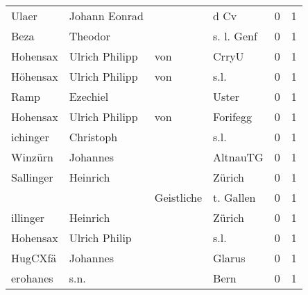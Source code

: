 \begin{center}
\begin{tiny}
\begin{longtabu}{llllrr}
                    Ulaer &                      Johann Eonrad &             &                                        d Cv &          0 &         1 \\
                     Beza &                            Theodor &             &                                  s. l. Genf &          0 &         1 \\
                 Hohensax &                     Ulrich Philipp &         von &                                       CrryU &          0 &         1 \\
                 Höhensax &                     Ulrich Philipp &         von &                                        s.l. &          0 &         1 \\
                     Ramp &                           Ezechiel &             &                                       Uster &          0 &         1 \\
                 Hohensax &                     Ulrich Philipp &         von &                                    Forifegg &          0 &         1 \\
                 ichinger &                          Christoph &             &                                        s.l. &          0 &         1 \\
                  Winzürn &                           Johannes &             &                                    AltnauTG &          0 &         1 \\
                Sallinger &                           Heinrich &             &                                      Zürich &          0 &         1 \\
                          &                                    &  Geistliche &                                   t. Gallen &          0 &         1 \\
                 illinger &                           Heinrich &             &                                      Zürich &          0 &         1 \\
                 Hohensax &                      Ulrich Philip &             &                                        s.l. &          0 &         1 \\
                  HugCXfä &                           Johannes &             &                                      Glarus &          0 &         1 \\
                 erohanes &                               s.n. &             &                                        Bern &          0 &         1 \\

\end{longtabu}
\end{tiny}
\end{center}
